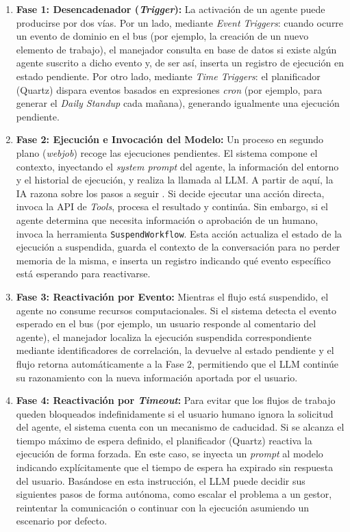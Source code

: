 \begin{enumerate}
    \item \textbf{Fase 1: Desencadenador (\emph{Trigger}):} La activación de un agente puede producirse por dos vías. Por un lado, mediante \emph{Event Triggers}: cuando ocurre un evento de dominio en el bus (por ejemplo, la creación de un nuevo elemento de trabajo), el manejador consulta en base de datos si existe algún agente suscrito a dicho evento y, de ser así, inserta un registro de ejecución en estado pendiente. Por otro lado, mediante \emph{Time Triggers}: el planificador (Quartz) dispara eventos basados en expresiones \emph{cron} (por ejemplo, para generar el \emph{Daily Standup} cada mañana), generando igualmente una ejecución pendiente.

    \item \textbf{Fase 2: Ejecución e Invocación del Modelo:} Un proceso en segundo plano (\emph{webjob}) recoge las ejecuciones pendientes. El sistema compone el contexto, inyectando el \emph{system prompt} del agente, la información del entorno y el historial de ejecución, y realiza la llamada al \ac{LLM}. A partir de aquí, la \ac{IA} razona sobre los pasos a seguir \cite{yao2022react}. Si decide ejecutar una acción directa, invoca la \ac{API} de \emph{Tools}, procesa el resultado y continúa. Sin embargo, si el agente determina que necesita información o aprobación de un humano, invoca la herramienta \texttt{SuspendWorkflow}. Esta acción actualiza el estado de la ejecución a suspendida, guarda el contexto de la conversación para no perder memoria de la misma, e inserta un registro indicando qué evento específico está esperando para reactivarse.

    \item \textbf{Fase 3: Reactivación por Evento:} Mientras el flujo está suspendido, el agente no consume recursos computacionales. Si el sistema detecta el evento esperado en el bus (por ejemplo, un usuario responde al comentario del agente), el manejador localiza la ejecución suspendida correspondiente mediante identificadores de correlación, la devuelve al estado pendiente y el flujo retorna automáticamente a la Fase 2, permitiendo que el \ac{LLM} continúe su razonamiento con la nueva información aportada por el usuario.

    \item \textbf{Fase 4: Reactivación por \emph{Timeout}:} Para evitar que los flujos de trabajo queden bloqueados indefinidamente si el usuario humano ignora la solicitud del agente, el sistema cuenta con un mecanismo de caducidad. Si se alcanza el tiempo máximo de espera definido, el planificador (Quartz) reactiva la ejecución de forma forzada. En este caso, se inyecta un \emph{prompt} al modelo indicando explícitamente que el tiempo de espera ha expirado sin respuesta del usuario. Basándose en esta instrucción, el \ac{LLM} puede decidir sus siguientes pasos de forma autónoma, como escalar el problema a un gestor, reintentar la comunicación o continuar con la ejecución asumiendo un escenario por defecto.
\end{enumerate}

